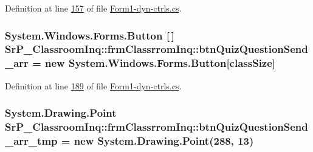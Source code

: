 \-Definition at line \hyperlink{_form1-dyn-ctrls_8cs_source_l00157}{157} of file \hyperlink{_form1-dyn-ctrls_8cs_source}{\-Form1-\/dyn-\/ctrls.\-cs}.

\hypertarget{class_sr_p___classroom_inq_1_1frm_classrrom_inq_a007012d0330b5c8ad6b29271ddefe7f9}{
\subsubsection[{btn\-Quiz\-Question\-Send\-\_\-arr}]{\setlength{\rightskip}{0pt plus 5cm}\-System.\-Windows.\-Forms.\-Button \mbox{[}$\,$\mbox{]} {\bf \-Sr\-P\-\_\-\-Classroom\-Inq\-::frm\-Classrrom\-Inq\-::btn\-Quiz\-Question\-Send\-\_\-arr} = new \-System.\-Windows.\-Forms.\-Button\mbox{[}{\bf class\-Size}\mbox{]}}}
\label{class_sr_p___classroom_inq_1_1frm_classrrom_inq_a007012d0330b5c8ad6b29271ddefe7f9}


\-Definition at line \hyperlink{_form1-dyn-ctrls_8cs_source_l00189}{189} of file \hyperlink{_form1-dyn-ctrls_8cs_source}{\-Form1-\/dyn-\/ctrls.\-cs}.

\hypertarget{class_sr_p___classroom_inq_1_1frm_classrrom_inq_a8dcbe5ae5d44d445994571c17345e756}{
\subsubsection[{btn\-Quiz\-Question\-Send\-\_\-arr\-\_\-tmp}]{\setlength{\rightskip}{0pt plus 5cm}\-System.\-Drawing.\-Point {\bf \-Sr\-P\-\_\-\-Classroom\-Inq\-::frm\-Classrrom\-Inq\-::btn\-Quiz\-Question\-Send\-\_\-arr\-\_\-tmp} = new \-System.\-Drawing.\-Point(288, 13)}}
\label{class_sr_p___classroom_inq_1_1frm_classrrom_inq_a8dcbe5ae5d44d445994571c17345e756}


